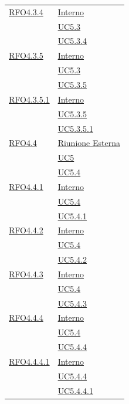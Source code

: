 \begin{itemize}
\begin{itemize}
\begin{itemize}
\begin{itemize}
\begin{longtable}{|>{\centering}m{5cm}|m{5cm}<{\centering}|}
\hyperlink{RFO4.3.4}{RFO4.3.4} & \hyperlink{Interno}{Interno}\\
& \hyperref[UC5.3]{UC5.3}\\
& \hyperref[UC5.3.4]{UC5.3.4}\\ \hline

\hyperlink{RFO4.3.5}{RFO4.3.5} & \hyperlink{Interno}{Interno}\\
& \hyperref[UC5.3]{UC5.3}\\
& \hyperref[UC5.3.5]{UC5.3.5}\\ \hline

\hyperlink{RFO4.3.5.1}{RFO4.3.5.1} & \hyperlink{Interno}{Interno}\\
& \hyperref[UC5.3.5]{UC5.3.5}\\
& \hyperref[UC5.3.5.1]{UC5.3.5.1}\\ \hline

\hyperlink{RFO4.4}{RFO4.4} & \hyperlink{Riunione Esterna}{Riunione Esterna}\\
& \hyperref[UC5]{UC5}\\
& \hyperref[UC5.4]{UC5.4}\\ \hline

\hyperlink{RFO4.4.1}{RFO4.4.1} & \hyperlink{Interno}{Interno}\\
& \hyperref[UC5.4]{UC5.4}\\
& \hyperref[UC5.4.1]{UC5.4.1}\\ \hline

\hyperlink{RFO4.4.2}{RFO4.4.2} & \hyperlink{Interno}{Interno}\\
& \hyperref[UC5.4]{UC5.4}\\
& \hyperref[UC5.4.2]{UC5.4.2}\\ \hline

\hyperlink{RFO4.4.3}{RFO4.4.3} & \hyperlink{Interno}{Interno}\\
& \hyperref[UC5.4]{UC5.4}\\
& \hyperref[UC5.4.3]{UC5.4.3}\\ \hline

\hyperlink{RFO4.4.4}{RFO4.4.4} & \hyperlink{Interno}{Interno}\\
& \hyperref[UC5.4]{UC5.4}\\
& \hyperref[UC5.4.4]{UC5.4.4}\\ \hline

\hyperlink{RFO4.4.4.1}{RFO4.4.4.1} & \hyperlink{Interno}{Interno}\\
& \hyperref[UC5.4.4]{UC5.4.4}\\
& \hyperref[UC5.4.4.1]{UC5.4.4.1}\\ \hline


\end{longtable}
\end{itemize}
\end{itemize}
\end{itemize}
\end{itemize}

